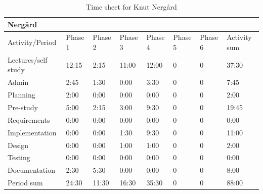 \documentclass[11pt]{book}
\begin{document}
\begin{table}[H]
\centering
\begin{tabular}{| l | l | l | l | l | l | l | l |}
    \hline
    Nergård             &          &          &          &          &             &             &              \\ \hline         
    Activity/Period     & Phase 1  & Phase 2  & Phase  3 & Phase 4  & Phase 5     & Phase 6     & Activity sum \\ \hline
    Lectures/self study & 12:15    & 2:15     & 11:00    & 12:00    & 0           & 0           & 37:30        \\ \hline
    Admin               & 2:45     & 1:30     & 0:00     & 3:30     & 0           & 0           & 7:45         \\ \hline
    Planning            & 2:00     & 0:00     & 0:00     & 0:00     & 0           & 0           & 2:00         \\ \hline
    Pre-study           & 5:00     & 2:15     & 3:00     & 9:30     & 0           & 0           & 19:45        \\ \hline
    Requirements        & 0:00     & 0:00     & 0:00     & 0:00     & 0           & 0           & 0:00         \\ \hline
    Implementation      & 0:00     & 0:00     & 1:30     & 9:30     & 0           & 0           & 11:00        \\ \hline
    Design              & 0:00     & 0:00     & 1:00     & 1:00     & 0           & 0           & 2:00         \\ \hline
    Testing             & 0:00     & 0:00     & 0:00     & 0:00     & 0           & 0           & 0:00         \\ \hline
    Documentation       & 2:30     & 5:30     & 0:00     & 0:00     & 0           & 0           & 8:00         \\ \hline
    Period sum          & 24:30    & 11:30    & 16:30    & 35:30    & 0           & 0           & 88:00        \\ \hline
\end{tabular}
\caption{Time sheet for Knut Nergård}
\label{tab:appendix_timesheets_knut}
\end{table}
\end{document}
